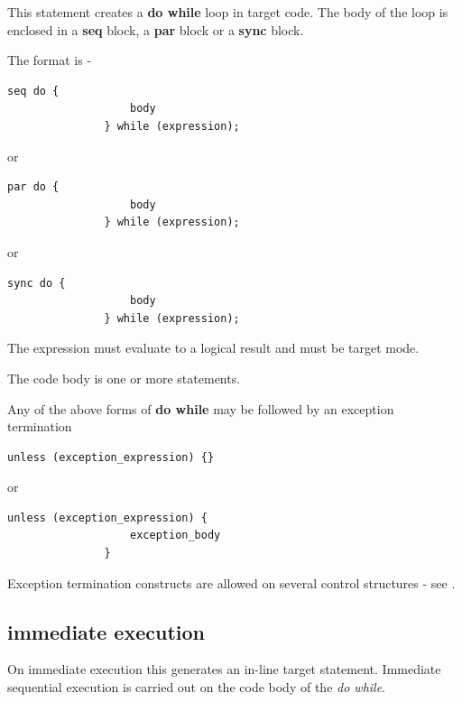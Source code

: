         This statement creates a {\bf do while} loop in target code. The body
        of the loop is enclosed in a {\bf seq} block, a {\bf par} block or a
        {\bf sync} block.

        The format is -
        \begin{lstlisting}[gobble=8, language=threepl]
               seq do {
                   body
               } while (expression);
        \end{lstlisting}
        or
        \begin{lstlisting}[gobble=8, language=threepl]
               par do {
                   body
               } while (expression);
        \end{lstlisting}
        or
        \begin{lstlisting}[gobble=8, language=threepl]
               sync do {
                   body
               } while (expression);
        \end{lstlisting}

        The expression must evaluate to a logical result and must be target
        mode.
        
        The code body is one or more statements.
        
        Any of the above forms of {\bf do while} may be followed by an
        exception termination
        \begin{lstlisting}[gobble=8, language=threepl]
               unless (exception_expression) {}
        \end{lstlisting}
        or
        \begin{lstlisting}[gobble=8, language=threepl]
               unless (exception_expression) {
                   exception_body
               }
        \end{lstlisting}
        
        Exception termination constructs are allowed on several control structures
        - see  .
        
        \subsection{immediate execution}
        
            On immediate execution this generates an in-line target statement.
            Immediate sequential execution is carried out on the code body
            of the {\em do while}.
        
